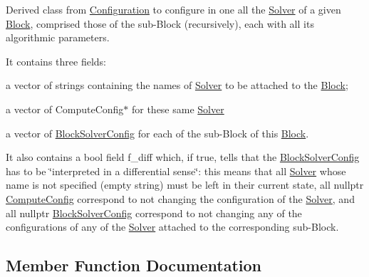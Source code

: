 Derived class from \mbox{\hyperlink{class_s_m_spp__di__unipi__it_1_1_configuration}{Configuration}} to configure in one all the \mbox{\hyperlink{class_s_m_spp__di__unipi__it_1_1_solver}{Solver}} of a given \mbox{\hyperlink{class_s_m_spp__di__unipi__it_1_1_block}{Block}}, comprised those of the sub-\/\+Block (recursively), each with all its algorithmic parameters.

It contains three fields\+:
\begin{DoxyItemize}
\item a vector of strings containing the names of \mbox{\hyperlink{class_s_m_spp__di__unipi__it_1_1_solver}{Solver}} to be attached to the \mbox{\hyperlink{class_s_m_spp__di__unipi__it_1_1_block}{Block}};
\item a vector of Compute\+Config$\ast$ for these same \mbox{\hyperlink{class_s_m_spp__di__unipi__it_1_1_solver}{Solver}}
\item a vector of \mbox{\hyperlink{class_s_m_spp__di__unipi__it_1_1_block_solver_config}{Block\+Solver\+Config}} for each of the sub-\/\+Block of this \mbox{\hyperlink{class_s_m_spp__di__unipi__it_1_1_block}{Block}}.
\end{DoxyItemize}

It also contains a bool field f\+\_\+diff which, if true, tells that the \mbox{\hyperlink{class_s_m_spp__di__unipi__it_1_1_block_solver_config}{Block\+Solver\+Config}} has to be \char`\"{}interpreted in a differential sense\char`\"{}\+: this means that all \mbox{\hyperlink{class_s_m_spp__di__unipi__it_1_1_solver}{Solver}} whose name is not specified (empty string) must be left in their current state, all nullptr \mbox{\hyperlink{class_s_m_spp__di__unipi__it_1_1_compute_config}{Compute\+Config}} correspond to not changing the configuration of the \mbox{\hyperlink{class_s_m_spp__di__unipi__it_1_1_solver}{Solver}}, and all nullptr \mbox{\hyperlink{class_s_m_spp__di__unipi__it_1_1_block_solver_config}{Block\+Solver\+Config}} correspond to not changing any of the configurations of any of the \mbox{\hyperlink{class_s_m_spp__di__unipi__it_1_1_solver}{Solver}} attached to the corresponding sub-\/\+Block. 

\subsection{Member Function Documentation}
\mbox{\label{class_s_m_spp__di__unipi__it_1_1_block_solver_config_a41a9cf4b8ab0ae3454431ec9333a98d5}} 
